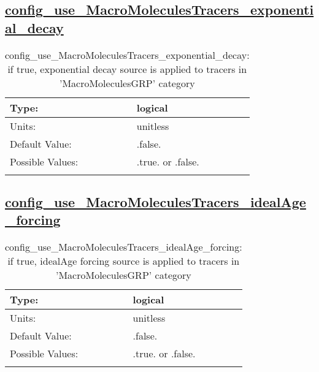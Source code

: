 \subsection[config\_use\_MacroMoleculesTracers\_exponential\_decay]{\hyperref[sec:nm_tab_tracer_forcing_MacroMoleculesTracers]{config\_use\_MacroMoleculesTracers\_exponential\_decay}}
\label{subsec:nm_sec_config_use_MacroMoleculesTracers_exponential_decay}
\begin{center}
\begin{longtable}{| p{2.0in} || p{4.0in} |}
    \hline
    Type: & logical \\
    \hline
    Units: & \si{unitless} \\
    \hline
    Default Value: & .false. \\
    \hline
    Possible Values: & .true. or .false. \\
    \hline
    \caption{config\_use\_MacroMoleculesTracers\_exponential\_decay: if true, exponential decay source is applied to tracers in 'MacroMoleculesGRP' category}
\end{longtable}
\end{center}
\subsection[config\_use\_MacroMoleculesTracers\_idealAge\_forcing]{\hyperref[sec:nm_tab_tracer_forcing_MacroMoleculesTracers]{config\_use\_MacroMoleculesTracers\_idealAge\_forcing}}
\label{subsec:nm_sec_config_use_MacroMoleculesTracers_idealAge_forcing}
\begin{center}
\begin{longtable}{| p{2.0in} || p{4.0in} |}
    \hline
    Type: & logical \\
    \hline
    Units: & \si{unitless} \\
    \hline
    Default Value: & .false. \\
    \hline
    Possible Values: & .true. or .false. \\
    \hline
    \caption{config\_use\_MacroMoleculesTracers\_idealAge\_forcing: if true, idealAge forcing source is applied to tracers in 'MacroMoleculesGRP' category}
\end{longtable}
\end{center}
